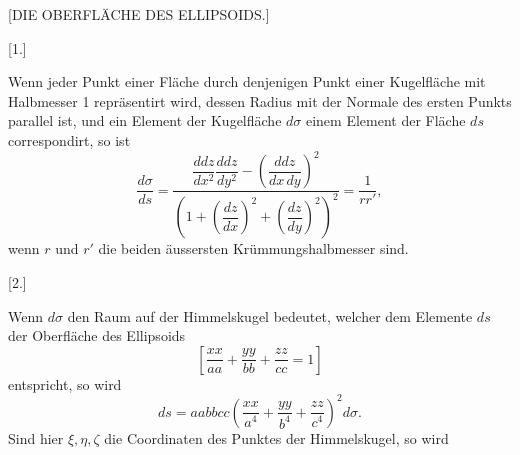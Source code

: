 \clearpage
{}%
\begin{center}{\large [DIE OBERFLÄCHE DES ELLIPSOIDS.]\par}\end{center}
\begin{center}[1.]\end{center}

Wenn jeder Punkt einer Fläche durch denjenigen Punkt einer Kugelfläche mit Halbmesser 1 repräsentirt wird, dessen Radius mit der Normale des ersten Punkts parallel ist, und ein Element der Kugelfläche $d\sigma$ einem Element der Fläche $ds$ correspondirt, so ist
\[
\frac{d\sigma}{ds}=\frac{\dfrac{ddz}{dx^2}\dfrac{ddz}{dy^2}-\left(\dfrac{ddz}{dx\,dy}\right)^2}{\left(1+\left(\dfrac{dz}{dx}\right)^2+\left(\dfrac{dz}{dy}\right)^2\right)^2}=\frac1{rr'},
\]
wenn $r$ und $r'$ die beiden äussersten Krümmungshalbmesser sind.
\begin{center}[2.]\end{center}

Wenn $d\sigma$ den Raum auf der Himmelskugel bedeutet, welcher dem Elemente $ds$ der Oberfläche des Ellipsoids
\[
\left[\frac{xx}{aa}+\frac{yy}{bb}+\frac{zz}{cc}=1\right]
\]
entspricht, so wird
\[
ds=aabbcc\left(\frac{xx}{a^4}+\frac{yy}{b^4}+\frac{zz}{c^4}\right)^2d\sigma.
\]
Sind hier $\xi,\eta,\zeta$ die Coordinaten des Punktes der Himmelskugel, so wird
